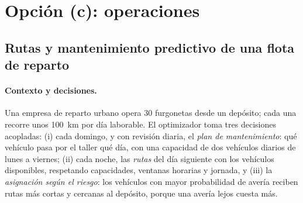 \section{Opción (c): operaciones}
\label{sec:proy-c}

\subsection*{Rutas y mantenimiento predictivo de una flota de reparto}

\paragraph{Contexto y decisiones.} Una empresa de reparto urbano opera 30 furgonetas desde un depósito; cada una recorre unos 100~km por día laborable. El optimizador toma tres decisiones acopladas: (i) cada domingo, y con revisión diaria, el \emph{plan de mantenimiento}: qué vehículo pasa por el taller qué día, con una capacidad de dos vehículos diarios de lunes a viernes; (ii) cada noche, las \emph{rutas} del día siguiente con los vehículos disponibles, respetando capacidades, ventanas horarias y jornada, y (iii) la \emph{asignación según el riesgo}: los vehículos con mayor probabilidad de avería reciben rutas más cortas y cercanas al depósito, porque una avería lejos cuesta más.

